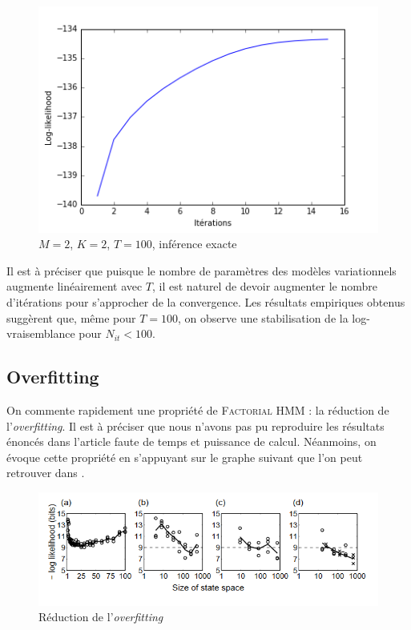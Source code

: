 \documentclass[10pt,a4paper]{article}
\newcommand{\fhmm}{\textsc{Factorial HMM}}
\begin{document}
 \begin{figure}[H]
\centering
\includegraphics[scale=0.3]{../resources/pictures/M2_K2_T100_exactinference.png}
\caption{$M=2$, $K=2$, $T=100$, inférence exacte}
\end{figure}

Il est à préciser que puisque le nombre de paramètres des modèles variationnels
augmente linéairement avec $T$, il est naturel de devoir augmenter le nombre
d'itérations pour s'approcher de la convergence.
Les résultats empiriques obtenus suggèrent que, même pour $T=100$, on observe
une stabilisation de la log-vraisemblance pour $N_{it}<100$.

\subsection{Overfitting}

On commente rapidement une propriété de \fhmm{} : la réduction de
l'\emph{overfitting}.
Il est à préciser que nous n'avons pas pu reproduire les résultats énoncés dans
l'article \cite{ghahramani1997factorial} faute de temps et puissance de calcul.
Néanmoins, on évoque cette propriété en s'appuyant sur le graphe suivant que
l'on peut retrouver dans \cite{ghahramani1997factorial}.

\begin{figure}[H]
\centering
\includegraphics[scale=0.5]{../resources/pictures/overfitting_res.png}
\caption{Réduction de l'\emph{overfitting}}
\end{figure}
\end{document}
